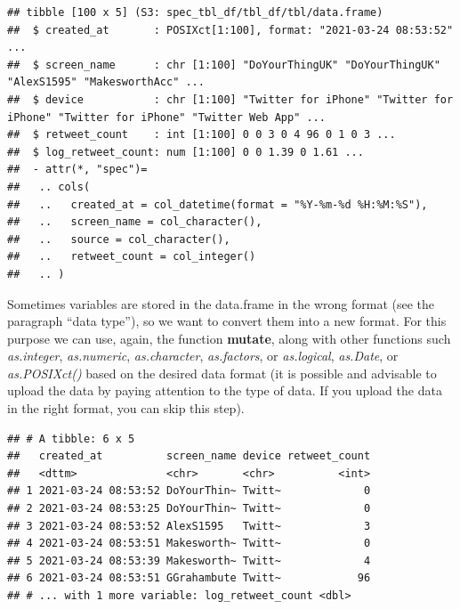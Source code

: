 \documentclass[
]{article}
\newenvironment{Shaded}{\begin{snugshade}}{\end{snugshade}}
\newcommand{\DataTypeTok}[1]{\textcolor[rgb]{0.13,0.29,0.53}{#1}}
\newcommand{\KeywordTok}[1]{\textcolor[rgb]{0.13,0.29,0.53}{\textbf{#1}}}
\newcommand{\NormalTok}[1]{#1}
\newcommand{\OperatorTok}[1]{\textcolor[rgb]{0.81,0.36,0.00}{\textbf{#1}}}
\newcommand{\StringTok}[1]{\textcolor[rgb]{0.31,0.60,0.02}{#1}}
\begin{document}
\begin{verbatim}
## tibble [100 x 5] (S3: spec_tbl_df/tbl_df/tbl/data.frame)
##  $ created_at       : POSIXct[1:100], format: "2021-03-24 08:53:52" ...
##  $ screen_name      : chr [1:100] "DoYourThingUK" "DoYourThingUK" "AlexS1595" "MakesworthAcc" ...
##  $ device           : chr [1:100] "Twitter for iPhone" "Twitter for iPhone" "Twitter for iPhone" "Twitter Web App" ...
##  $ retweet_count    : int [1:100] 0 0 3 0 4 96 0 1 0 3 ...
##  $ log_retweet_count: num [1:100] 0 0 1.39 0 1.61 ...
##  - attr(*, "spec")=
##   .. cols(
##   ..   created_at = col_datetime(format = "%Y-%m-%d %H:%M:%S"),
##   ..   screen_name = col_character(),
##   ..   source = col_character(),
##   ..   retweet_count = col_integer()
##   .. )
\end{verbatim}

Sometimes variables are stored in the data.frame in the wrong format (see the paragraph ``data type''), so we want to convert them into a new format. For this purpose we can use, again, the function \textbf{mutate}, along with other functions such \emph{as.integer}, \emph{as.numeric}, \emph{as.character}, \emph{as.factors}, or \emph{as.logical}, \emph{as.Date}, or \emph{as.POSIXct()} based on the desired data format (it is possible and advisable to upload the data by paying attention to the type of data. If you upload the data in the right format, you can skip this step).

\begin{Shaded}
\end{Shaded}

\begin{verbatim}
## # A tibble: 6 x 5
##   created_at          screen_name device retweet_count
##   <dttm>              <chr>       <chr>          <int>
## 1 2021-03-24 08:53:52 DoYourThin~ Twitt~             0
## 2 2021-03-24 08:53:25 DoYourThin~ Twitt~             0
## 3 2021-03-24 08:53:52 AlexS1595   Twitt~             3
## 4 2021-03-24 08:53:51 Makesworth~ Twitt~             0
## 5 2021-03-24 08:53:39 Makesworth~ Twitt~             4
## 6 2021-03-24 08:53:51 GGrahambute Twitt~            96
## # ... with 1 more variable: log_retweet_count <dbl>
\end{verbatim}
\end{document}
